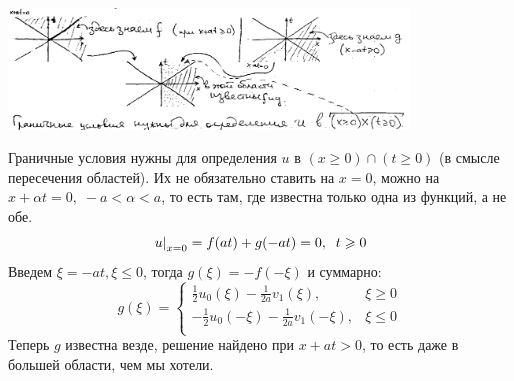 \begin{center}
\includegraphics[width=0.8\textwidth]{4_1_new}
\end{center}

Граничные условия нужны для определения $u$ в $(x \geq 0)\cap(t \geq 0)$ (в смысле пересечения областей). Их не обязательно ставить на $x=0$, можно на $x + \alpha t = 0, \; -a < \alpha < a$, то есть там, где известна только одна из функций, а не обе.
$$
\left. u\right|_{x=0} = f(at) + g(-at)=0, \;\; t \geqslant 0
$$
Введем $\xi = -at, \xi \leq 0$, тогда $g(\xi) = -f(-\xi)$ и суммарно:
\begin{equation*}
    g(\xi) = \begin{cases}
        \frac{1}{2}u_0(\xi)-\frac{1}{2a}v_1(\xi), & \xi \geq 0\\
        -\frac{1}{2}u_0(-\xi)-\frac{1}{2a}v_1(-\xi), & \xi \leq 0\\
    \end{cases}
\end{equation*}
Теперь $g$ известна везде, решение найдено при $x + at > 0$, то есть даже в большей области, чем мы хотели.

\begin{center}
\end{center}

